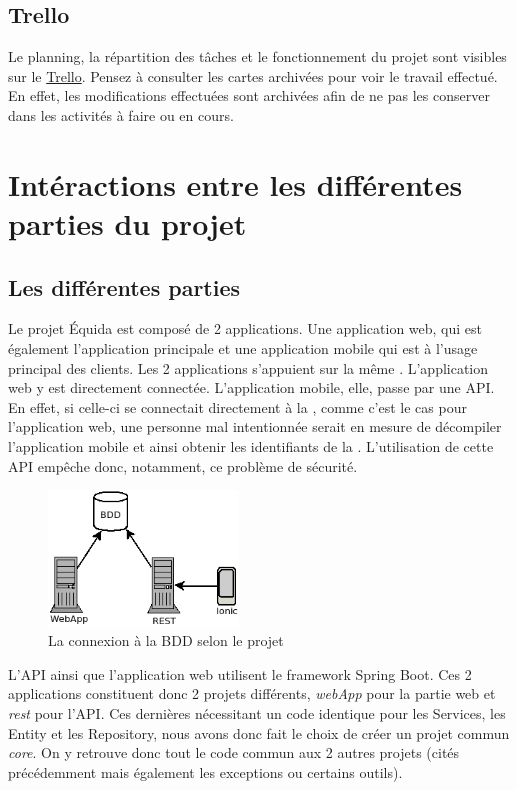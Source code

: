 		\subsection{Trello}

			Le planning, la répartition des tâches et le fonctionnement du projet sont visibles sur le \href{https://trello.com/b/jrKixhpu/equida-spring}{Trello}.
			Pensez à consulter les cartes archivées pour voir le travail effectué. En effet, les modifications effectuées sont archivées afin de ne pas les conserver dans les activités à faire ou en cours.

	\section{Intéractions entre les différentes parties du projet}
		\subsection{Les différentes parties}
			Le projet Équida est composé de 2 applications. Une application web, qui est également l'application principale et une application mobile qui est à l'usage principal des clients. Les 2 applications s'appuient sur la même \bdd{}. L'application web y est directement connectée. L'application mobile, elle, passe par une API. En effet, si celle-ci se connectait directement à la \bdd{}, comme c'est le cas pour l'application web, une personne mal intentionnée serait en mesure de décompiler l'application mobile et ainsi obtenir les identifiants de la \bdd{}. L'utilisation de cette API empêche donc, notamment, ce problème de sécurité.

			\begin{figure}[H]
				\centering\includegraphics[width=0.45\textwidth, keepaspectratio]{res/diag_infra.png}
				\caption{La connexion à la BDD selon le projet}
			\end{figure}

			L'API ainsi que l'application web utilisent le framework Spring Boot. Ces 2 applications constituent donc 2 projets différents,  \textit{webApp} pour la partie web et  \textit{rest} pour l'API. Ces dernières nécessitant un code identique pour les Services, les Entity et les Repository, nous avons donc fait le choix de créer un projet commun  \textit{core}. On y retrouve donc tout le code commun aux 2 autres projets (cités précédemment mais également les exceptions ou certains outils).

